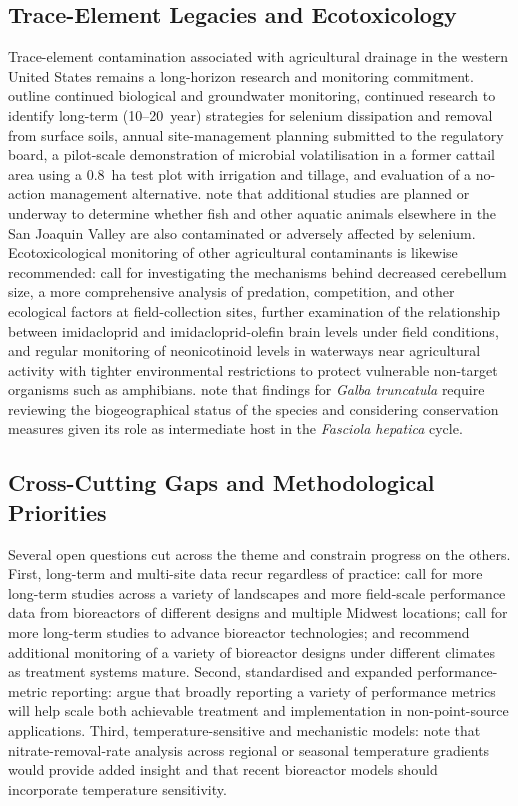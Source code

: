 \subsection{Trace-Element Legacies and Ecotoxicology}
Trace-element contamination associated with agricultural drainage in the western United States remains a long-horizon research and monitoring commitment. \textcite{BENSON1993} outline continued biological and groundwater monitoring, continued research to identify long-term (10--20~year) strategies for selenium dissipation and removal from surface soils, annual site-management planning submitted to the regulatory board, a pilot-scale demonstration of microbial volatilisation in a former cattail area using a 0.8~ha test plot with irrigation and tillage, and evaluation of a no-action management alternative. \textcite{SAIKI1987} note that additional studies are planned or underway to determine whether fish and other aquatic animals elsewhere in the San Joaquin Valley are also contaminated or adversely affected by selenium. Ecotoxicological monitoring of other agricultural contaminants is likewise recommended: \textcite{Campbell2023} call for investigating the mechanisms behind decreased cerebellum size, a more comprehensive analysis of predation, competition, and other ecological factors at field-collection sites, further examination of the relationship between imidacloprid and imidacloprid-olefin brain levels under field conditions, and regular monitoring of neonicotinoid levels in waterways near agricultural activity with tighter environmental restrictions to protect vulnerable non-target organisms such as amphibians. \textcite{Dreyfuss2018} note that findings for \textit{Galba truncatula} require reviewing the biogeographical status of the species and considering conservation measures given its role as intermediate host in the \textit{Fasciola hepatica} cycle.

\subsection{Cross-Cutting Gaps and Methodological Priorities}
Several open questions cut across the theme and constrain progress on the others. First, long-term and multi-site data recur regardless of practice: \textcite{Bell2015} call for more long-term studies across a variety of landscapes and more field-scale performance data from bioreactors of different designs and multiple Midwest locations; \textcite{Christianson2021} call for more long-term studies to advance bioreactor technologies; and \textcite{Bailon2025} recommend additional monitoring of a variety of bioreactor designs under different climates as treatment systems mature. Second, standardised and expanded performance-metric reporting: \textcite{Maxwell2022} argue that broadly reporting a variety of performance metrics will help scale both achievable treatment and implementation in non-point-source applications. Third, temperature-sensitive and mechanistic models: \textcite{Christianson2021} note that nitrate-removal-rate analysis across regional or seasonal temperature gradients would provide added insight and that recent bioreactor models should incorporate temperature sensitivity.

